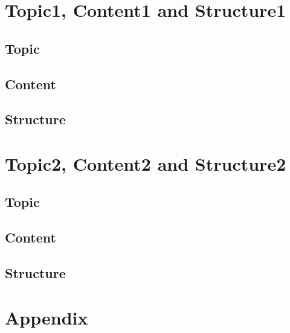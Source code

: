 \documentclass[12pt, a4paper]{article}
\begin{document}
\nocite{*}



\tableofcontents
\newpage
{}
\setcounter{lastroman}{\value{page}}
\pagestyle{plain}
\maketitle
\begin{abstract}
    \lipsum[20]
\end{abstract}
\section{Topic1, Content1 and Structure1}
\subsection{Topic}
\lipsum[10]
\subsection{Content}
\lipsum[15]
\subsection{Structure}
\lipsum[20]
\section{Topic2, Content2 and Structure2}
\subsection{Topic}
\lipsum[25]
\subsection{Content}
\lipsum[30]
\subsection{Structure}
\lipsum[35]
\newpage

\renewcommand{\thesubsection}{\Alph{subsection}}
\setcounter{page}{\value{lastroman}}
\section*{Appendix}


\newpage


\newpage
\listoffigures





\end{document}
